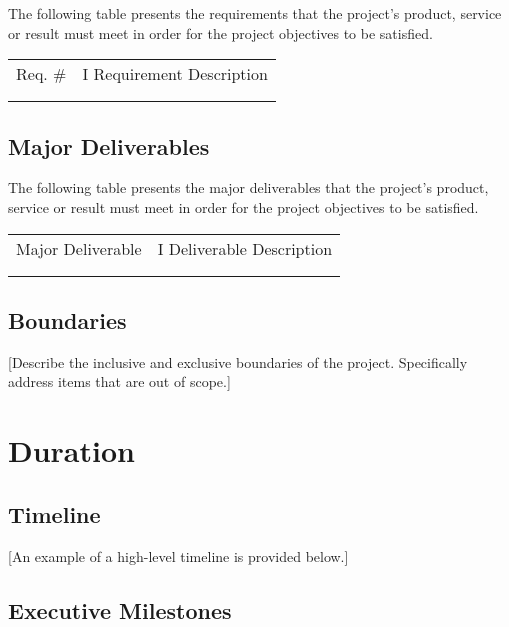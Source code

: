 \documentclass[a4paper, 11pt]{article}
\begin{document}
The following table presents the requirements that the project's
product, service or result must meet in order for the project objectives
to be satisfied.

\begin{longtable}[]{@{}ll@{}}
\toprule
\endhead
Req. \# & I Requirement Description\tabularnewline
&\tabularnewline
&\tabularnewline
\bottomrule
\end{longtable}

\hypertarget{major-deliverables}{%
\subsection{Major Deliverables}\label{major-deliverables}}

The following table presents the major deliverables that the project's
product, service or result must meet in order for the project objectives
to be satisfied.

\begin{longtable}[]{@{}ll@{}}
\toprule
\endhead
Major Deliverable & I Deliverable Description\tabularnewline
&\tabularnewline
&\tabularnewline
\bottomrule
\end{longtable}

\hypertarget{boundaries}{%
\subsection{Boundaries}\label{boundaries}}

{[}Describe the inclusive and exclusive boundaries of the project.
Specifically address items that are out of scope.{]}

\hypertarget{duration}{%
\section{Duration}\label{duration}}

\hypertarget{timeline}{%
\subsection{Timeline}\label{timeline}}

{[}An example of a high-level timeline is provided below.{]}

\hypertarget{executive-milestones}{%
\subsection{Executive Milestones }\label{executive-milestones}}
\end{document}
